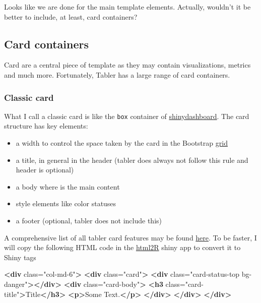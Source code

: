 \documentclass[
]{book}
\newenvironment{Shaded}{\begin{snugshade}}{\end{snugshade}}
\newcommand{\KeywordTok}[1]{\textcolor[rgb]{0.13,0.29,0.53}{\textbf{#1}}}
\newcommand{\NormalTok}[1]{#1}
\newcommand{\OtherTok}[1]{\textcolor[rgb]{0.56,0.35,0.01}{#1}}
\newcommand{\StringTok}[1]{\textcolor[rgb]{0.31,0.60,0.02}{#1}}
\providecommand{\tightlist}{%
  \setlength{\itemsep}{0pt}\setlength{\parskip}{0pt}}
\begin{document}
Looks like we are done for the main template elements. Actually, wouldn't it be better to include, at least, card containers?

\hypertarget{card-containers}{%
\subsection{Card containers}\label{card-containers}}

Card are a central piece of template as they may contain visualizations, metrics and much more. Fortunately, Tabler has a large range of card containers.

\hypertarget{classic-card}{%
\subsubsection{Classic card}\label{classic-card}}

What I call a classic card is like the \texttt{box} container of \href{https://rstudio.github.io/shinydashboard/structure.html}{shinydashboard}. The card structure has key elements:

\begin{itemize}
\tightlist
\item
  a width to control the space taken by the card in the Bootstrap \href{https://getbootstrap.com/docs/4.0/layout/grid/}{grid}
\item
  a title, in general in the header (tabler does always not follow this rule and header is optional)
\item
  a body where is the main content
\item
  style elements like color statuses
\item
  a footer (optional, tabler does not include this)
\end{itemize}

A comprehensive list of all tabler card features may be found \href{https://preview-dev.tabler.io/docs/cards.html}{here}. To be faster, I will copy the following HTML code in the \href{https://github.com/alandipert/html2r}{html2R} shiny app to convert it to Shiny tags

\begin{Shaded}
\begin{Highlighting}[]
\KeywordTok{<div}\OtherTok{ class=}\StringTok{"col-md-6"}\KeywordTok{>}
  \KeywordTok{<div}\OtherTok{ class=}\StringTok{"card"}\KeywordTok{>}
    \KeywordTok{<div}\OtherTok{ class=}\StringTok{"card-status-top bg-danger"}\KeywordTok{></div>}
    \KeywordTok{<div}\OtherTok{ class=}\StringTok{"card-body"}\KeywordTok{>}
      \KeywordTok{<h3}\OtherTok{ class=}\StringTok{"card-title"}\KeywordTok{>}\NormalTok{Title}\KeywordTok{</h3>}
      \KeywordTok{<p>}\NormalTok{Some Text.}\KeywordTok{</p>}
    \KeywordTok{</div>}
  \KeywordTok{</div>}
\KeywordTok{</div>}
\end{Highlighting}
\end{Shaded}
\end{document}
